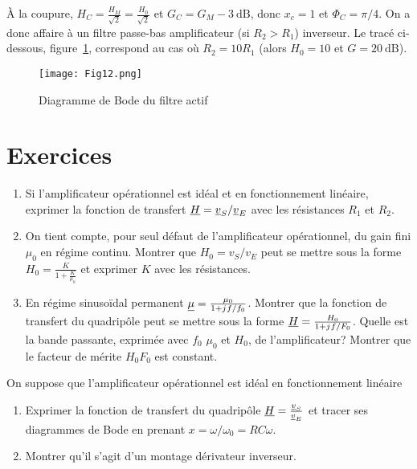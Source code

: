 À la coupure, \(H_C = \frac{H_M}{\sqrt{2}} = \frac{H_0}{\sqrt{2}}\) et \(G_C = 
G_M -\SI{3}{\dB}\), donc \(x_c=1\) et \(\Phi_C = \pi/4\). On a donc affaire à 
un filtre passe-bas amplificateur (si \(R_2>R_1\)) inverseur. Le tracé 
ci-dessous, figure~\ref{fig:BodeAOP}, correspond au cas où \(R_2=10R_1\) (alors 
\(H_0=10\) et \(G = \SI{20}{\dB}\)).
\begin{figure}[h!]%
    \centering
    \texttt{[image: Fig12.png]}
    \caption{Diagramme de Bode du filtre actif}
    \label{fig:BodeAOP}
\end{figure}%
\section{Exercices}%
\begin{exercice}%
\begin{enumerate}%
  \item Si l'amplificateur opérationnel est idéal et en fonctionnement 
    linéaire, exprimer la fonction de transfert \(\underline{H} = 
    \underline{v}_S/\underline{v}_E\) avec les résistances \(R_1\) et \(R_2\).
  \item On tient compte, pour seul défaut de l'amplificateur opérationnel, du 
    gain fini \(\mu_0\) en régime continu. Montrer que \(H_0 = v_S / v_E\) peut 
    se mettre sous la forme \(H_0 = \frac{K}{1+\frac{K}{\mu_0}}\) et exprimer 
    \(K\) avec les résistances.
  \item En régime sinusoïdal permanent \(\underline{\mu} = \frac{\mu_0}{1+ {j\mkern1mu} 
    f/f_0}\). Montrer que la fonction de transfert du quadripôle peut se mettre 
    sous la forme \(\underline{H} = \frac{H_0}{1+{j\mkern1mu} f/F_0}\). Quelle est la bande 
    passante, exprimée avec \(f_0\) \(\mu_0\) et \(H_0\),  de l'amplificateur? 
    Montrer que le facteur de mérite \(H_0F_0\) est constant.
\end{enumerate}%
\end{exercice}%
\begin{exercice}%
On suppose que l'amplificateur opérationnel est idéal en fonctionnement 
  linéaire
\begin{enumerate}%
  \item Exprimer la fonction de transfert du quadripôle \(\underline{H} = 
    \frac{\underline{v}_S}{\underline{v}_E}\) et tracer ses diagrammes de Bode 
    en prenant \(x = \omega/\omega_0=RC\omega\).
  \item Montrer qu'il s'agit d'un montage dérivateur inverseur.
\end{enumerate}%
\end{exercice}%
